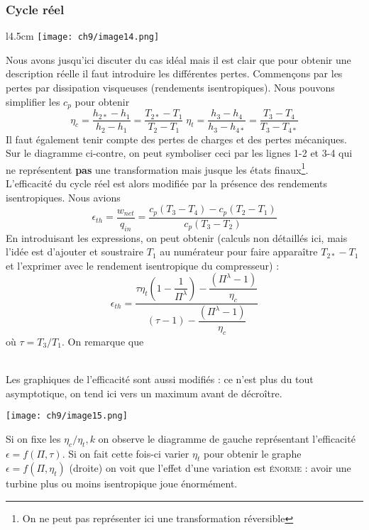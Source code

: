 		\subsubsection{Cycle réel}
							\begin{wrapfigure}[11]{l}{4.5cm}
					\vspace{-5mm}
	\texttt{[image: ch9/image14.png]}
		\end{wrapfigure}
		Nous avons jusqu'ici discuter du cas idéal mais il est clair que pour obtenir une 
		description réelle il faut introduire les différentes pertes. Commençons par les 
		pertes par dissipation visqueuses (rendements isentropiques). Nous pouvons simplifier 
		les $c_p$ pour obtenir
		\begin{equation}
		\eta_c = \dfrac{h_{2*}-h_1}{h_2-h_1}=\dfrac{T_{2*}-T_1}{T_2-T_1} \;
		\eta_t = \dfrac{h_3-h_4}{h_3-h_{4*}} =\dfrac{T_3-T_4}{T_3-T_{4*}}
		\end{equation}
		Il faut également tenir compte des pertes de charges et des pertes mécaniques. Sur 
		le diagramme ci-contre, on peut symboliser ceci par les lignes 1-2 et 3-4 qui ne 
		représentent \textbf{pas} une transformation mais jusque les états finaux\footnote{On 
		ne peut pas représenter ici une transformation réversible}.\\
		
		L'efficacité du cycle réel est alors modifiée par la présence des rendements isentropiques. 
		Nous avions
		\begin{equation}
		\epsilon_{th} = \dfrac{w_{net}}{q_{in}} = \dfrac{c_p(T_3-T_4)-c_p(T_2-T_1)}{c_p(T_3-T_2)}
		\end{equation}
		En introduisant les expressions, on peut obtenir (calculs non détaillés ici, mais l'idée 
		est d'ajouter et soustraire $T_1$ au numérateur pour faire apparaître $T_{2*}-T_1$ et 
		l'exprimer avec le rendement isentropique du compresseur) :
		\begin{equation}
		\epsilon_{th} = \dfrac{\tau\eta_t\left(1-\dfrac{1}{\Pi^\lambda}\right)-\dfrac{\left(
		\Pi^\lambda-1\right)}{\eta_c}}{(\tau-1)-\dfrac{(\Pi^\lambda-1)}{\eta_c}}
		\end{equation}
		où $\tau = T_3/T_1$. On remarque que \\
		
		\
		
		Les graphiques de l'efficacité sont aussi modifiés : ce n'est plus du tout 
		asymptotique, on tend ici vers un maximum avant de décroître.
		\begin{center}
		\texttt{[image: ch9/image15.png]}
		\end{center}
		Si on fixe les $\eta_c/\eta_t, k$ on observe le diagramme de gauche représentant 
		l'efficacité $\epsilon = f(\Pi,\tau)$. Si on fait cette fois-ci varier $\eta_t$ 
		pour obtenir le graphe $\epsilon = f(\Pi,\eta_t)$ (droite) on voit que l'effet d'une 
		variation est \textsc{énorme} : avoir une turbine plus ou moins isentropique 
		joue énormément.
		

